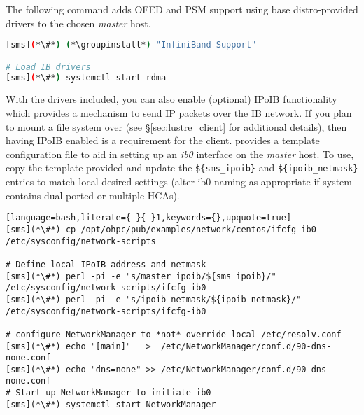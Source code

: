 The following command adds OFED and PSM support using base distro-provided drivers
to the chosen {\em master} host.

\begin{lstlisting}[language=bash,keywords={}]
[sms](*\#*) (*\groupinstall*) "InfiniBand Support"

# Load IB drivers
[sms](*\#*) systemctl start rdma
\end{lstlisting}



With the \InfiniBand{} drivers included, you can also enable (optional) IPoIB functionality
which provides a mechanism to send IP packets over the IB network. If you plan
to mount a \Lustre{} file system over \InfiniBand{} (see \S\ref{sec:lustre_client}
for additional details), then having IPoIB enabled is a requirement for the
\Lustre{} client. \OHPC{} provides a template configuration file to aid in setting up
an {\em ib0} interface on the {\em master} host. To use, copy the template
provided and update the \texttt{\$\{sms\_ipoib\}} and
\texttt{\$\{ipoib\_netmask\}} entries to match local desired settings (alter ib0
naming as appropriate if system contains dual-ported or multiple HCAs).

\begin{lstlisting}[language=bash,literate={-}{-}1,keywords={},upquote=true]
[sms](*\#*) cp /opt/ohpc/pub/examples/network/centos/ifcfg-ib0 /etc/sysconfig/network-scripts

# Define local IPoIB address and netmask
[sms](*\#*) perl -pi -e "s/master_ipoib/${sms_ipoib}/" /etc/sysconfig/network-scripts/ifcfg-ib0
[sms](*\#*) perl -pi -e "s/ipoib_netmask/${ipoib_netmask}/" /etc/sysconfig/network-scripts/ifcfg-ib0

# configure NetworkManager to *not* override local /etc/resolv.conf
[sms](*\#*) echo "[main]"   >  /etc/NetworkManager/conf.d/90-dns-none.conf
[sms](*\#*) echo "dns=none" >> /etc/NetworkManager/conf.d/90-dns-none.conf
# Start up NetworkManager to initiate ib0
[sms](*\#*) systemctl start NetworkManager

\end{lstlisting}

